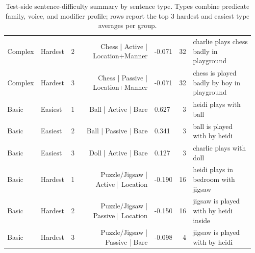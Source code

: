 \begin{table}[t]
\begin{tabular}{@{}lllrlrl@{}}
Complex & Hardest & 2 & Chess | Active | Location+Manner & -0.071 & 32 & charlie plays chess badly in playground
\\
Complex & Hardest & 3 & Chess | Passive | Location+Manner & -0.071 & 32 & chess is played badly by boy in playground
\\
Basic & Easiest & 1 & Ball | Active | Bare & 0.627 & 3 & heidi plays with ball
\\
Basic & Easiest & 2 & Ball | Passive | Bare & 0.341 & 3 & ball is played with by heidi
\\
Basic & Easiest & 3 & Doll | Active | Bare & 0.127 & 3 & charlie plays with doll
\\
Basic & Hardest & 1 & Puzzle/Jigsaw | Active | Location & -0.190 & 16 & heidi plays in bedroom with jigsaw
\\
Basic & Hardest & 2 & Puzzle/Jigsaw | Passive | Location & -0.150 & 16 & jigsaw is played with by heidi inside
\\
Basic & Hardest & 3 & Puzzle/Jigsaw | Passive | Bare & -0.098 & 4 & jigsaw is played with by heidi
\\
\bottomrule
\end{tabular}
\caption{\small Test-side sentence-difficulty summary by sentence type. Types combine predicate family, voice, and modifier profile; rows report the top 3 hardest and easiest type averages per group.}
\label{tab:test_sentence_difficulty_types}
\end{table}
